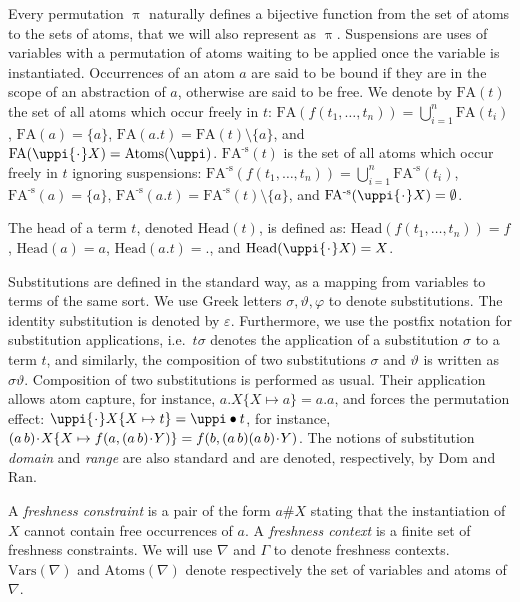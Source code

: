 \documentclass{llncs}
\newcommand{\dom}{\mathrm{Dom}}
\newcommand{\ran}{\mathrm{Ran}}
\newcommand{\vars}{\mathrm{Vars}}
\newcommand{\swap}[2]{\ensuremath{(#1\, #2)}}
\newcommand{\head}{\mathrm{Head}}
\newcommand{\permap}{{\mkern 1mu\cdot \mkern 1mu}}
\newcommand{\permef}{\bullet}
\newcommand{\ids}{\varepsilon}
\newcommand\ppi{\uppi}
\newcommand{\atoms}{\mathrm{Atoms}}
\newcommand{\fatoms}{\mathrm{FA^{\text{-s}}}}
\newcommand{\fatom}{\mathrm{FA}}
\begin{document}
Every permutation $\ppi$ naturally defines a bijective function from
the set of atoms to the sets of atoms, that we will also represent as
$\ppi$. Suspensions are uses of variables with a permutation of atoms
waiting to be applied once the variable is instantiated. Occurrences
of an atom $a$ are said to be bound if they are in the scope of an
abstraction of $a$, otherwise are said to be free. We
  denote by $\fatom(t)$ the set of all atoms which occur freely in
  $t$: $\fatom(f(t_1,\ldots,t_n))=\bigcup_{i=1}^{n} \fatom(t_i)$,
  $\fatom(a)=\{a\}$, $\fatom(a.t)=\fatom(t)\setminus\{a\}$, and
  $\fatom(\ppi\permap X)=\atoms(\ppi)$.
  $\fatoms(t)$ is the set of all atoms which occur freely in
  $t$ ignoring suspensions:
  $\fatoms(f(t_1,\ldots,t_n))=\bigcup_{i=1}^{n} \fatoms(t_i)$,
  $\fatoms(a)=\{a\}$, $\fatoms(a.t)=\fatoms(t)\setminus\{a\}$, and
  $\fatoms(\ppi\permap X)=\emptyset$.

The head of a term $t$, denoted $\head(t)$, is defined as: $\head({ f(t_1,\ldots,t_n)})= f$, $\head({ a})= a$, $\head({
  a.t})= .$, and $\head({ \ppi\permap X}) = X$.

Substitutions are defined in the standard way, as a mapping from
variables to terms of the same sort.
We use Greek letters
$\sigma,\vartheta,\varphi$ to denote substitutions. The identity
substitution is denoted by $\ids$. 
Furthermore, we use the postfix notation for substitution applications, i.e.~$t\sigma$ denotes the application of a substitution $\sigma$ to a term $t$, and similarly, the composition of two substitutions $\sigma$ and $\vartheta$ is written as $\sigma\vartheta$. Composition of two substitutions is performed as usual.
Their application allows atom
capture, for instance, $a.X\{X\mapsto a\}= a.a$, and forces the
permutation effect: $\ppi\permap X\{X\mapsto t\}=\ppi\permef t$, for
instance, $\swap{a}{b}\permap X\{X\mapsto f(a,\swap{a}{b}\permap
Y)\}=f(b,\swap{a}{b}\swap{a}{b}\permap Y)$. The notions of substitution
\emph{domain} and \emph{range} are also standard and are denoted,
respectively, by $\dom$ and $\ran$.

A \emph{freshness constraint} is a pair of the form $a \# X$ stating
that the instantiation of $ X$ cannot contain free occurrences of
$a$. A \emph{freshness context} is a finite set of freshness
  constraints. We will use $\nabla$ and $\Gamma$ to denote freshness
  contexts. $\vars(\nabla)$ and $\atoms(\nabla)$ denote respectively
the set of variables and atoms of $\nabla$.
\end{document}
